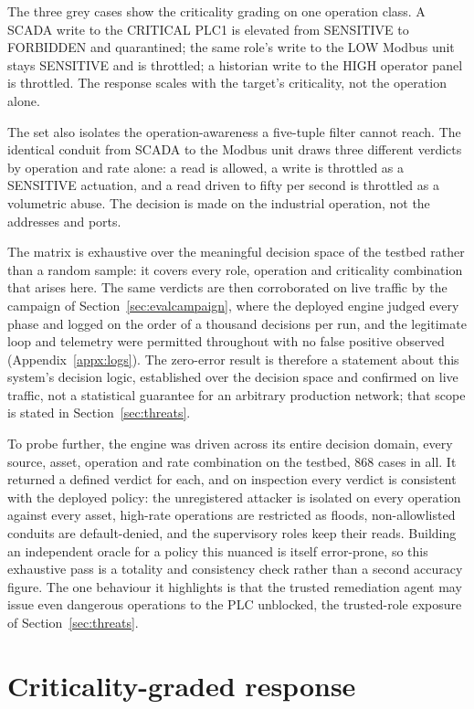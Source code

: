 The three grey cases show the criticality grading on one operation class. A SCADA write to the CRITICAL PLC1 is elevated from SENSITIVE to FORBIDDEN and quarantined; the same role's write to the LOW Modbus unit stays SENSITIVE and is throttled; a historian write to the HIGH operator panel is throttled. The response scales with the target's criticality, not the operation alone.

The set also isolates the operation-awareness a five-tuple filter cannot reach. The identical conduit from SCADA to the Modbus unit draws three different verdicts by operation and rate alone: a read is allowed, a write is throttled as a SENSITIVE actuation, and a read driven to fifty per second is throttled as a volumetric abuse. The decision is made on the industrial operation, not the addresses and ports.

The matrix is exhaustive over the meaningful decision space of the testbed rather than a random sample: it covers every role, operation and criticality combination that arises here. The same verdicts are then corroborated on live traffic by the campaign of Section~\ref{sec:evalcampaign}, where the deployed engine judged every phase and logged on the order of a thousand decisions per run, and the legitimate loop and telemetry were permitted throughout with no false positive observed (Appendix~\ref{appx:logs}). The zero-error result is therefore a statement about this system's decision logic, established over the decision space and confirmed on live traffic, not a statistical guarantee for an arbitrary production network; that scope is stated in Section~\ref{sec:threats}.

To probe further, the engine was driven across its entire decision domain, every source, asset, operation and rate combination on the testbed, 868 cases in all. It returned a defined verdict for each, and on inspection every verdict is consistent with the deployed policy: the unregistered attacker is isolated on every operation against every asset, high-rate operations are restricted as floods, non-allowlisted conduits are default-denied, and the supervisory roles keep their reads. Building an independent oracle for a policy this nuanced is itself error-prone, so this exhaustive pass is a totality and consistency check rather than a second accuracy figure. The one behaviour it highlights is that the trusted remediation agent may issue even dangerous operations to the PLC unblocked, the trusted-role exposure of Section~\ref{sec:threats}.

\section{Criticality-graded response}
\label{sec:evalcriticality}

